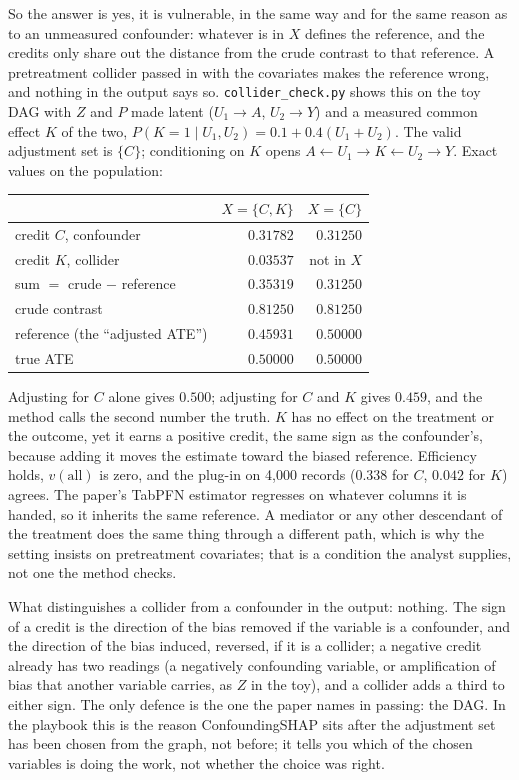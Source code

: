 \documentclass[10pt,letterpaper]{article}
\begin{document}
So the answer is yes, it is vulnerable, in the same way and for the same reason as to an unmeasured confounder: whatever is in $X$ defines the reference, and the credits only share out the distance from the crude contrast to that reference. A pretreatment collider passed in with the covariates makes the reference wrong, and nothing in the output says so. \texttt{collider\_check.py} shows this on the toy DAG with $Z$ and $P$ made latent ($U_1 \to A$, $U_2 \to Y$) and a measured common effect $K$ of the two, $P(K=1 \mid U_1, U_2) = 0.1 + 0.4(U_1 + U_2)$. The valid adjustment set is $\{C\}$; conditioning on $K$ opens $A \leftarrow U_1 \to K \leftarrow U_2 \to Y$. Exact values on the population:
\begin{center}
\begin{tabular}{@{}lrr@{}}
\toprule & $X = \{C, K\}$ & $X = \{C\}$\\\midrule
credit $C$, confounder & $0.31782$ & $0.31250$\\
credit $K$, collider & $0.03537$ & not in $X$\\
sum $=$ crude $-$ reference & $0.35319$ & $0.31250$\\
crude contrast & $0.81250$ & $0.81250$\\
reference (the ``adjusted ATE'') & $0.45931$ & $0.50000$\\
true ATE & $0.50000$ & $0.50000$\\
\bottomrule
\end{tabular}
\end{center}
Adjusting for $C$ alone gives $0.500$; adjusting for $C$ and $K$ gives $0.459$, and the method calls the second number the truth. $K$ has no effect on the treatment or the outcome, yet it earns a positive credit, the same sign as the confounder's, because adding it moves the estimate toward the biased reference. Efficiency holds, $v(\text{all})$ is zero, and the plug-in on 4,000 records ($0.338$ for $C$, $0.042$ for $K$) agrees. The paper's TabPFN estimator regresses on whatever columns it is handed, so it inherits the same reference. A mediator or any other descendant of the treatment does the same thing through a different path, which is why the setting insists on pretreatment covariates; that is a condition the analyst supplies, not one the method checks.

What distinguishes a collider from a confounder in the output: nothing. The sign of a credit is the direction of the bias removed if the variable is a confounder, and the direction of the bias induced, reversed, if it is a collider; a negative credit already has two readings (a negatively confounding variable, or amplification of bias that another variable carries, as $Z$ in the toy), and a collider adds a third to either sign. The only defence is the one the paper names in passing: the DAG. In the playbook this is the reason ConfoundingSHAP sits after the adjustment set has been chosen from the graph, not before; it tells you which of the chosen variables is doing the work, not whether the choice was right.
\end{document}
